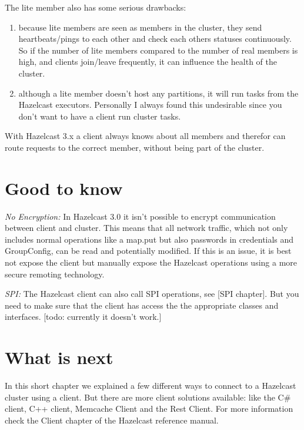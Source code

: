 The lite member also has some serious drawbacks:
\begin{enumerate}
\item because lite members are seen as members in the cluster, they send heartbeats/pings to each other and check each others statuses continuously. So if the number of lite members compared to the number of real members is high, and clients join/leave frequently, it can influence the health of the cluster. 
\item although a lite member doesn't host any partitions, it will run tasks from the Hazelcast executors. Personally I always found this undesirable since you don't want to have a client run cluster tasks.
\end{enumerate}
With Hazelcast 3.x a client always knows about all members and therefor can route requests to the correct member, without being part of the cluster. 

\section{Good to know}

\emph{No Encryption:} In Hazelcast 3.0 it isn't possible to encrypt communication between client and cluster. This means that all network traffic, which not only includes normal operations like a map.put but also passwords in credentials and GroupConfig, can be read and potentially modified. If this is an issue, it is best not expose the client but manually expose the Hazelcast operations using a more secure remoting technology. 

\emph{SPI:} The Hazelcast client can also call SPI operations, see [SPI chapter]. But you need to make sure that the client has access the the appropriate classes and interfaces.  [todo: currently it doesn't work.]

\section{What is next}
In this short chapter we explained a few different ways to connect to a Hazelcast cluster using a client. But there are more client solutions available: like the C\# client, C++ client, Memcache Client and the Rest Client. For more information check the Client chapter of the Hazelcast reference manual.